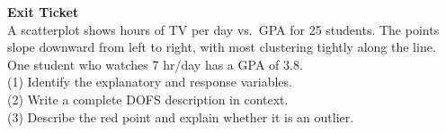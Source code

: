 \documentclass[aspectratio=169, 11pt]{beamer}
\begin{document}
{
\begin{frame}[plain]
  \vspace{3cm}\hspace{0.55cm}%
  \begin{minipage}{0.9\textwidth}
    {\color{goldacc}\bfseries\large Exit Ticket}\\[0.6cm]
    {\color{white} A scatterplot shows hours of TV per day vs.\ GPA for 25 students.
    The points slope downward from left to right, with most clustering tightly along the line.
    One student who watches 7 hr/day has a GPA of 3.8.}\\[0.5cm]
    {\color{skymid}\small
      (1) Identify the explanatory and response variables.\\
      (2) Write a complete DOFS description in context.\\
      (3) Describe the red point and explain whether it is an outlier.}
  \end{minipage}
\end{frame}
}
\end{document}

